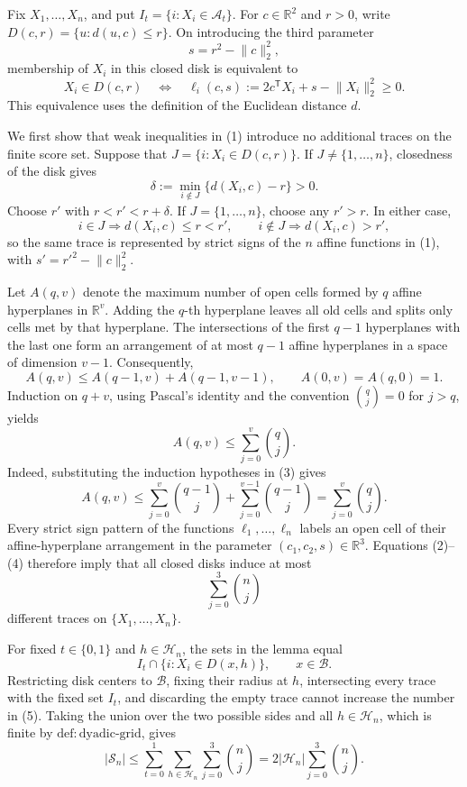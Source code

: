 Fix \(X_1,\ldots,X_n\), and put \(I_t=\{i:X_i\in\mathcal A_t\}\).  For \(c\in\mathbb R^2\) and \(r>0\), write \(D(c,r)=\{u:d(u,c)\le r\}\).  On introducing the third parameter
\[
 s=r^2-\lVert c\rVert_2^2,
\]
membership of \(X_i\) in this closed disk is equivalent to
\[
 X_i\in D(c,r)\quad\Longleftrightarrow\quad
 \ell_i(c,s):=2c^{\mathsf T}X_i+s-\lVert X_i\rVert_2^2\ge0. \tag{1}
\]
This equivalence uses the definition of the Euclidean distance \(d\).

We first show that weak inequalities in (1) introduce no additional traces on the finite score set.  Suppose that \(J=\{i:X_i\in D(c,r)\}\).  If \(J\ne\{1,\ldots,n\}\), closedness of the disk gives
\[
 \delta:=\min_{i\notin J}\bigl\{d(X_i,c)-r\bigr\}>0.
\]
Choose \(r'\) with \(r<r'<r+\delta\).  If \(J=\{1,\ldots,n\}\), choose any \(r'>r\).  In either case,
\[
 i\in J\Longrightarrow d(X_i,c)\le r<r',\qquad
 i\notin J\Longrightarrow d(X_i,c)>r', \tag{2}
\]
so the same trace is represented by strict signs of the \(n\) affine functions in (1), with \(s'=r'^2-\lVert c\rVert_2^2\).

Let \(A(q,v)\) denote the maximum number of open cells formed by \(q\) affine hyperplanes in \(\mathbb R^v\).  Adding the \(q\)-th hyperplane leaves all old cells and splits only cells met by that hyperplane.  The intersections of the first \(q-1\) hyperplanes with the last one form an arrangement of at most \(q-1\) affine hyperplanes in a space of dimension \(v-1\).  Consequently,
\[
 A(q,v)\le A(q-1,v)+A(q-1,v-1),\qquad
 A(0,v)=A(q,0)=1. \tag{3}
\]
Induction on \(q+v\), using Pascal's identity and the convention \(\binom qj=0\) for \(j>q\), yields
\[
 A(q,v)\le\sum_{j=0}^{v}\binom qj. \tag{4}
\]
Indeed, substituting the induction hypotheses in (3) gives
\[
 A(q,v)\le\sum_{j=0}^{v}\binom{q-1}{j}
             +\sum_{j=0}^{v-1}\binom{q-1}{j}
          =\sum_{j=0}^{v}\binom qj.
\]
Every strict sign pattern of the functions \(\ell_1,\ldots,\ell_n\) labels an open cell of their affine-hyperplane arrangement in the parameter \((c_1,c_2,s)\in\mathbb R^3\).  Equations (2)--(4) therefore imply that all closed disks induce at most
\[
 \sum_{j=0}^{3}\binom nj \tag{5}
\]
different traces on \(\{X_1,\ldots,X_n\}\).

For fixed \(t\in\{0,1\}\) and \(h\in\mathcal H_n\), the sets in the lemma equal
\[
 I_t\cap\{i:X_i\in D(x,h)\},\qquad x\in\mathcal B.
\]
Restricting disk centers to \(\mathcal B\), fixing their radius at \(h\), intersecting every trace with the fixed set \(I_t\), and discarding the empty trace cannot increase the number in (5).  Taking the union over the two possible sides and all \(h\in\mathcal H_n\), which is finite by \(\mathrm{def:dyadic\text{-}grid}\), gives
\[
 |\mathscr S_n|\le\sum_{t=0}^{1}\sum_{h\in\mathcal H_n}\sum_{j=0}^{3}\binom nj
 =2|\mathcal H_n|\sum_{j=0}^{3}\binom nj. \tag{6}
\]


